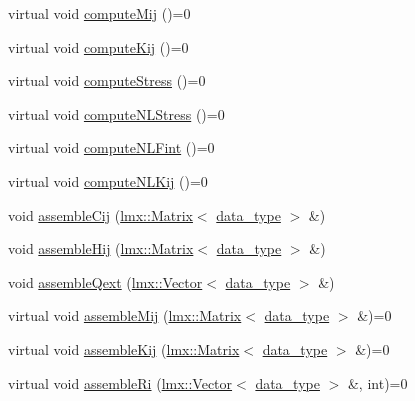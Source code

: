 \begin{DoxyCompactItemize}
virtual void \hyperlink{classmknix_1_1_gauss_point_a964d66daa8891736077630549d034a05}{compute\+Mij} ()=0
\item 
virtual void \hyperlink{classmknix_1_1_gauss_point_af8d8db54e116df23c8fe035c8ee00636}{compute\+Kij} ()=0
\item 
virtual void \hyperlink{classmknix_1_1_gauss_point_af57ea3edb397b1e6c629598b31f3b32b}{compute\+Stress} ()=0
\item 
virtual void \hyperlink{classmknix_1_1_gauss_point_ab66cf51691cebc823492f3b7df73d006}{compute\+N\+L\+Stress} ()=0
\item 
virtual void \hyperlink{classmknix_1_1_gauss_point_a1840943ceb93ff8183a4a81947ba9872}{compute\+N\+L\+Fint} ()=0
\item 
virtual void \hyperlink{classmknix_1_1_gauss_point_af8cc1b4fddbb7afa8c54f57f784f38fc}{compute\+N\+L\+Kij} ()=0
\item 
void \hyperlink{classmknix_1_1_gauss_point_aec8b4913cc95ba20cff54736f63f1547}{assemble\+Cij} (\hyperlink{classlmx_1_1_matrix}{lmx\+::\+Matrix}$<$ \hyperlink{namespacemknix_a16be4b246fbf2cceb141e3a179111020}{data\+\_\+type} $>$ \&)
\item 
void \hyperlink{classmknix_1_1_gauss_point_a1e1448cd0c3e4d5014cf1bfe21b4d166}{assemble\+Hij} (\hyperlink{classlmx_1_1_matrix}{lmx\+::\+Matrix}$<$ \hyperlink{namespacemknix_a16be4b246fbf2cceb141e3a179111020}{data\+\_\+type} $>$ \&)
\item 
void \hyperlink{classmknix_1_1_gauss_point_a1c39b381deef9d070fa4a28816b8bb2f}{assemble\+Qext} (\hyperlink{classlmx_1_1_vector}{lmx\+::\+Vector}$<$ \hyperlink{namespacemknix_a16be4b246fbf2cceb141e3a179111020}{data\+\_\+type} $>$ \&)
\item 
virtual void \hyperlink{classmknix_1_1_gauss_point_a7ec8e4157586cea2da3156152ff47b85}{assemble\+Mij} (\hyperlink{classlmx_1_1_matrix}{lmx\+::\+Matrix}$<$ \hyperlink{namespacemknix_a16be4b246fbf2cceb141e3a179111020}{data\+\_\+type} $>$ \&)=0
\item 
virtual void \hyperlink{classmknix_1_1_gauss_point_a569e0c3c3e2cf22706f9b45ebc6fec0e}{assemble\+Kij} (\hyperlink{classlmx_1_1_matrix}{lmx\+::\+Matrix}$<$ \hyperlink{namespacemknix_a16be4b246fbf2cceb141e3a179111020}{data\+\_\+type} $>$ \&)=0
\item 
virtual void \hyperlink{classmknix_1_1_gauss_point_acf4227076ed25bdb9054d178ddd2a41f}{assemble\+Ri} (\hyperlink{classlmx_1_1_vector}{lmx\+::\+Vector}$<$ \hyperlink{namespacemknix_a16be4b246fbf2cceb141e3a179111020}{data\+\_\+type} $>$ \&, int)=0
\item 

\end{DoxyCompactItemize}
